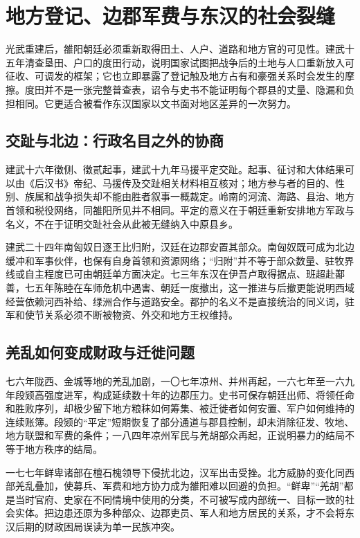 \section{地方登记、边郡军费与东汉的社会裂缝}
\label{sec:eastern-han-regions-households-frontier}

光武重建后，雒阳朝廷必须重新取得田土、人户、道路和地方官的可见性。建武十五年清查垦田、户口的度田行动，说明国家试图把战争后的土地与人口重新放入可征收、可调发的框架；它也立即暴露了登记触及地方占有和豪强关系时会发生的摩擦。度田并不是一张完整普查表，诏令与史书不能证明每个郡县的丈量、隐漏和负担相同。它更适合被看作东汉国家以文书面对地区差异的一次努力。

\subsection{交趾与北边：行政名目之外的协商}

建武十六年徵侧、徵贰起事，建武十九年马援平定交趾。起事、征讨和大体结果可以由《后汉书》帝纪、马援传及交趾相关材料相互核对；地方参与者的目的、性别、族属和战争损失却不能由胜者叙事一概裁定。岭南的河流、海路、县治、地方首领和税役网络，同雒阳所见并不相同。平定的意义在于朝廷重新安排地方军政与名义，不在于证明交趾社会从此被无缝纳入中原县乡。

建武二十四年南匈奴日逐王比归附，汉廷在边郡安置其部众。南匈奴既可成为北边缓冲和军事伙伴，也保有自身首领和资源网络；“归附”并不等于部众数量、驻牧界线或自主程度已可由朝廷单方面决定。七三年东汉在伊吾卢取得据点、班超赴鄯善，七五年陈睦在车师危机中遇害、朝廷一度撤出，这一推进与后撤更能说明西域经营依赖河西补给、绿洲合作与道路安全。都护的名义不是直接统治的同义词，驻军和使节关系必须不断被物资、外交和地方王权维持。

\subsection{羌乱如何变成财政与迁徙问题}

七六年陇西、金城等地的羌乱加剧，一〇七年凉州、并州再起，一六七年至一六九年段颎高强度进军，构成延续数十年的边郡压力。史书可保存朝廷出师、将领任命和胜败序列，却极少留下地方粮秣如何筹集、被迁徙者如何安置、军户如何维持的连续账簿。段颎的“平定”短期恢复了部分通道与郡县控制，却未消除征发、牧地、地方联盟和军费的条件；一八四年凉州军民与羌胡部众再起，正说明暴力的结局不等于地方秩序的结局。

一七七年鲜卑诸部在檀石槐领导下侵扰北边，汉军出击受挫。北方威胁的变化同西部羌乱叠加，使募兵、军费和地方协力成为雒阳难以回避的负担。“鲜卑”“羌胡”都是当时官府、史家在不同情境中使用的分类，不可被写成内部统一、目标一致的社会实体。把边患还原为多种部众、边郡吏员、军人和地方居民的关系，才不会将东汉后期的财政困局误读为单一民族冲突。

